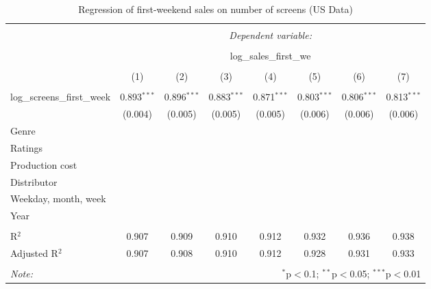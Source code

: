 \begin{table}[!htbp] \centering 
	\caption{Regression of first-weekend sales on number of screens (US Data)} 
	\label{part2.1_tab1} 
	\begin{tabular}{@{\extracolsep{0pt}}lccccccc} 
		\\[-1.8ex]\hline 
		\hline \\[-1.8ex] 
		& \multicolumn{7}{c}{\textit{Dependent variable:}} \\ 
		\cline{2-8} 
		\\[-1.8ex] & \multicolumn{7}{c}{log\_sales\_first\_we} \\ 
		\\[-1.8ex] & (1) & (2) & (3) & (4) & (5) & (6) & (7)\\ 
		\hline \\[-1.8ex] 
		log\_screens\_first\_week & 0.893$^{***}$ & 0.896$^{***}$ & 0.883$^{***}$ & 0.871$^{***}$ & 0.803$^{***}$ & 0.806$^{***}$ & 0.813$^{***}$ \\ 
		& (0.004) & (0.005) & (0.005) & (0.005) & (0.006) & (0.006) & (0.006) \\ 
		Genre & & \checkmark & \checkmark & \checkmark & \checkmark & \checkmark & \checkmark\\  
		Ratings & & & \checkmark & \checkmark & \checkmark & \checkmark & \checkmark \\
		Production cost & & & & \checkmark & \checkmark & \checkmark & \checkmark \\
		Distributor & &&&& \checkmark & \checkmark & \checkmark \\
		Weekday, month, week &&&&&& \checkmark & \checkmark\\
		Year &&&&&&& \checkmark \\
		\hline \\[-1.8ex] 
		R$^{2}$ & 0.907 & 0.909 & 0.910 & 0.912 & 0.932 & 0.936 & 0.938 \\ 
		Adjusted R$^{2}$ & 0.907 & 0.908 & 0.910 & 0.912 & 0.928 & 0.931 & 0.933 \\ 
		\hline 
		\hline \\[-1.8ex] 
		\textit{Note:}  & \multicolumn{7}{r}{$^{*}$p$<$0.1; $^{**}$p$<$0.05; $^{***}$p$<$0.01} \\ 
	\end{tabular} 
\end{table} 
